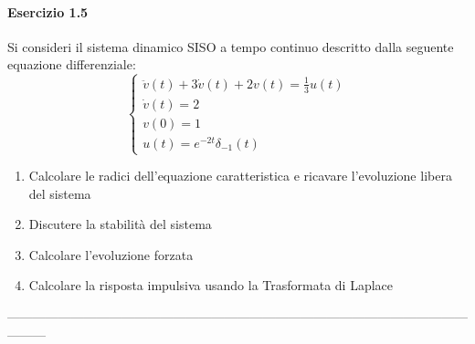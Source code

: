 \documentclass[12pt,a4paper]{article}
\begin{document}
	\paragraph{Esercizio 1.5} Si consideri il sistema dinamico SISO a tempo continuo descritto dalla seguente equazione differenziale:
	\[
		\begin{cases}
			\ddot{v}(t) + 3\dot{v}(t) + 2v(t) = \frac{1}{3}u(t)\\
			\dot{v}(t) = 2\\
			v(0) = 1\\
			u(t) = e^{-2t}\delta_{-1}(t)
		\end{cases}
	\]
	\begin{enumerate}
		\item Calcolare le radici dell'equazione caratteristica e ricavare l'evoluzione libera del sistema
		\item Discutere la stabilità del sistema
		\item Calcolare l'evoluzione forzata
		\item Calcolare la risposta impulsiva usando la Trasformata di Laplace
	\end{enumerate}
	---------------------------------------------------------------------------------------------------------------------
\end{document}
